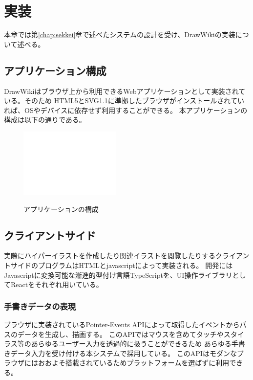 \chapter{実装}
\label{chap:jissou}

本章では第\ref{chap:sekkei}章で述べたシステムの設計を受け、DrawWikiの実装について述べる。

\newpage

\section{アプリケーション構成}
DrawWikiはブラウザ上から利用できるWebアプリケーションとして実装されている。そのため
HTML5とSVG1.1に準拠したブラウザがインストールされていれば、OSやデバイスに依存せず利用することができる。
本アプリケーションの構成は以下の通りである。

\begin{figure}[htbp]
    \begin{center}
    {\includegraphics[width=50mm]{images/testimage.png}} \end{center}
    \caption{アプリケーションの構成}
\end{figure}

\section{クライアントサイド}
実際にハイパーイラストを作成したり関連イラストを閲覧したりするクライアントサイドのプログラムはHTMLとjavascriptによって実装される。
開発にはJavascriptに変換可能な漸進的型付け言語TypeScriptを、UI操作ライブラリとしてReactをそれぞれ用いている。

\subsection{手書きデータの表現}
ブラウザに実装されているPointer-Events APIによって取得したイベントからパスのデータを生成し、描画する。
このAPIではマウスを含めてタッチやスタイラス等のあらゆるユーザー入力を透過的に扱うことができるため
あらゆる手書きデータ入力を受け付ける本システムで採用している。
このAPIはモダンなブラウザにはおおよそ搭載されているためプラットフォームを選ばずに利用できる。

